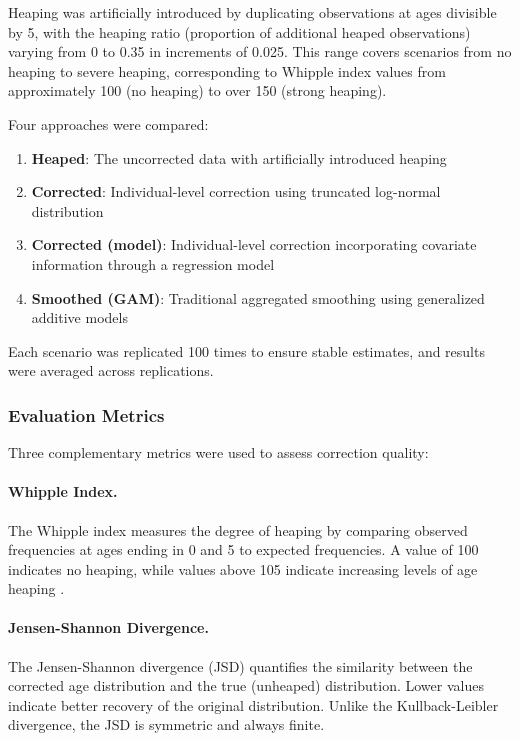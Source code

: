 \documentclass[pdflatex,sn-mathphys-num]{sn-jnl}%
\theoremstyle{thmstyleone}%
\theoremstyle{thmstyletwo}%
\theoremstyle{thmstylethree}%
\begin{document}
Heaping was artificially introduced by duplicating observations at ages divisible by 5, with the heaping ratio (proportion of additional heaped observations) varying from 0 to 0.35 in increments of 0.025. This range covers scenarios from no heaping to severe heaping, corresponding to Whipple index values from approximately 100 (no heaping) to over 150 (strong heaping).

Four approaches were compared:
\begin{enumerate}
    \item \textbf{Heaped}: The uncorrected data with artificially introduced heaping
    \item \textbf{Corrected}: Individual-level correction using truncated log-normal distribution
    \item \textbf{Corrected (model)}: Individual-level correction incorporating covariate information through a regression model
    \item \textbf{Smoothed (GAM)}: Traditional aggregated smoothing using generalized additive models
\end{enumerate}

Each scenario was replicated 100 times to ensure stable estimates, and results were averaged across replications.

\subsubsection{Evaluation Metrics}

Three complementary metrics were used to assess correction quality:

\paragraph{Whipple Index.} The Whipple index \citep{spoorenberg2007} measures the degree of heaping by comparing observed frequencies at ages ending in 0 and 5 to expected frequencies. A value of 100 indicates no heaping, while values above 105 indicate increasing levels of age heaping \citep{un55}.

\paragraph{Jensen-Shannon Divergence.} The Jensen-Shannon divergence (JSD) quantifies the similarity between the corrected age distribution and the true (unheaped) distribution. Lower values indicate better recovery of the original distribution. Unlike the Kullback-Leibler divergence, the JSD is symmetric and always finite.
\end{document}
